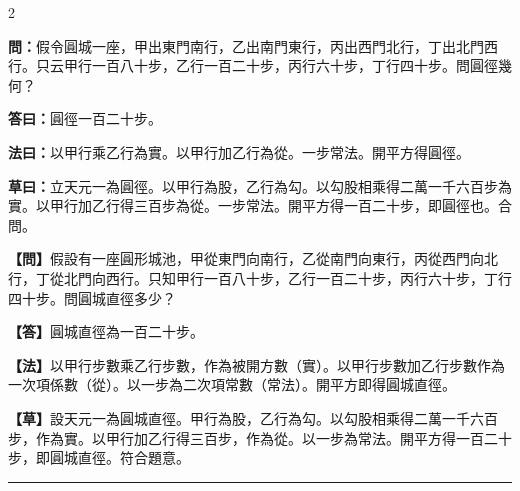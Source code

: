 \documentclass[11pt,a4paper]{article}
\newcommand{\longline}{\noindent\rule{\textwidth}{0.4pt}}
\newcommand{\wenC}[1]{\par\noindent\textbf{\textcolor{probcolor}{問：}}{#1}\par}
\newcommand{\daC}[1]{\par\noindent\textbf{\textcolor{anscolor}{答曰：}}{#1}\par}
\newcommand{\fayueC}[1]{\par\noindent\textbf{\textcolor{methodcolor}{法曰：}}{#1}\par}
\newcommand{\caoyueC}[1]{\par\noindent\textbf{草曰：}{#1}\par}
\newcommand{\wenM}[1]{\par\noindent\textbf{\textcolor{probcolor}{【問】}}{#1}\par}
\newcommand{\daM}[1]{\par\noindent\textbf{\textcolor{anscolor}{【答】}}{#1}\par}
\newcommand{\fayueM}[1]{\par\noindent\textbf{\textcolor{methodcolor}{【法】}}{#1}\par}
\newcommand{\caoyueM}[1]{\par\noindent\textbf{【草】}{#1}\par}
\begin{document}
\begin{paracol}{2}

\wenC{假令圓城一座，甲出東門南行，乙出南門東行，丙出西門北行，丁出北門西行。只云甲行一百八十步，乙行一百二十步，丙行六十步，丁行四十步。問圓徑幾何？}

\daC{圓徑一百二十步。}

\fayueC{以甲行乘乙行為實。以甲行加乙行為從。一步常法。開平方得圓徑。}

\caoyueC{立天元一為圓徑。以甲行為股，乙行為勾。以勾股相乘得二萬一千六百步為實。以甲行加乙行得三百步為從。一步常法。開平方得一百二十步，即圓徑也。合問。}

\switchcolumn

\wenM{假設有一座圓形城池，甲從東門向南行，乙從南門向東行，丙從西門向北行，丁從北門向西行。只知甲行一百八十步，乙行一百二十步，丙行六十步，丁行四十步。問圓城直徑多少？}

\daM{圓城直徑為一百二十步。}

\fayueM{以甲行步數乘乙行步數，作為被開方數（實）。以甲行步數加乙行步數作為一次項係數（從）。以一步為二次項常數（常法）。開平方即得圓城直徑。}

\caoyueM{設天元一為圓城直徑。甲行為股，乙行為勾。以勾股相乘得二萬一千六百步，作為實。以甲行加乙行得三百步，作為從。以一步為常法。開平方得一百二十步，即圓城直徑。符合題意。}

\end{paracol}

\vspace{0.3cm}
\longline
\end{document}
